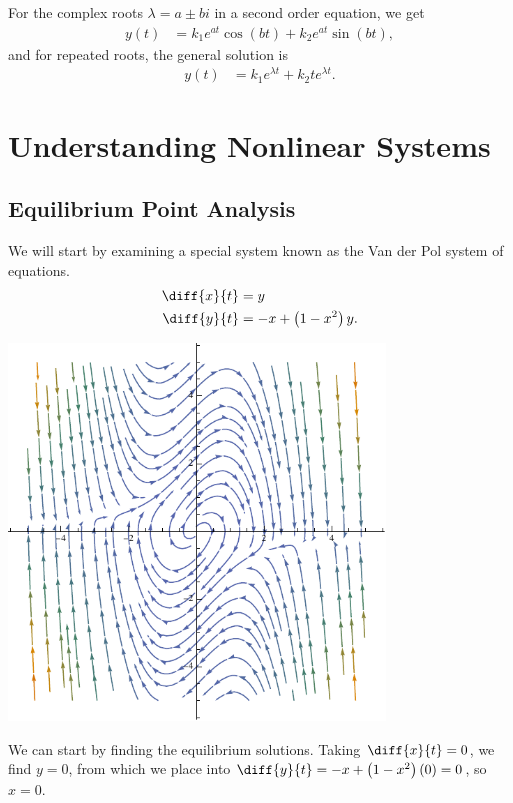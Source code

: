 \documentclass[10pt]{mypackage}
\begin{document}
For the complex roots $\lambda = a \pm bi$ in a second order equation, we get
\begin{align*}
  y(t)  &= k_1e^{at}\cos\left(bt\right) + k_2e^{at}\sin\left(bt\right),
\end{align*}
and for repeated roots, the general solution is
\begin{align*}
  y(t) &= k_1e^{\lambda t} + k_2te^{\lambda t}.
\end{align*}

\section{Understanding Nonlinear Systems}%
\subsection{Equilibrium Point Analysis}%
We will start by examining a special system known as the Van der Pol system of equations.
\begin{align*}
  \diff{x}{t} &= y\\
  \diff{y}{t} &= -x + \left(1-x^2\right)y.
\end{align*}
\begin{center}
  \includegraphics[width=10cm]{images/van_der_pol_equation.pdf}
\end{center}
We can start by finding the equilibrium solutions. Taking $\diff{x}{t} = 0$, we find $y = 0$, from which we place into $\diff{y}{t} = -x + \left(1-x^2\right)\left(0\right) = 0$, so $x = 0$.\newline
\end{document}
